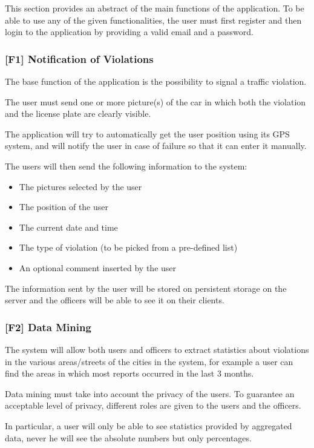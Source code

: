 This section provides an abstract of the main functions of the application. To be able to use any of the given functionalities, the user must first register and then login to the application by providing a valid email and a password.
\subsubsection[Notification of Violations]{[F1] Notification of Violations\hypertarget{sec:f1}{}}
\label{sec:notification_of_violations}
The base function of the application is the possibility to signal a traffic violation.

The user must send one or more picture(s) of the car in which both the violation and the license plate are clearly visible.

The application will try to automatically get the user position using its GPS system, and will notify the user in case of failure so that it can enter it manually.

The users will then send the following information to the system:
\begin{itemize}
    \item The pictures selected by the user
    \item The position of the user
    \item The current date and time
    \item The type of violation (to be picked from a pre-defined list)
    \item An optional comment inserted by the user
\end{itemize}
The information sent by the user will be stored on persistent storage on the server and the officers will be able to see it on their clients.

\clearpage
\subsubsection[Data Mining]{[F2] Data Mining\hypertarget{sec:f2}{}}
The system will allow both users and officers to extract statistics about violations in the various areas/streets of the cities in the system,
for example a user can find the areas in which most reports occurred in the last 3 months.

Data mining must take into account the privacy of the users.
To guarantee an acceptable level of privacy, different roles are given to the users and the officers.

In particular, a user will only be able to see statistics provided by aggregated data, never he will see the absolute numbers but only percentages. 

